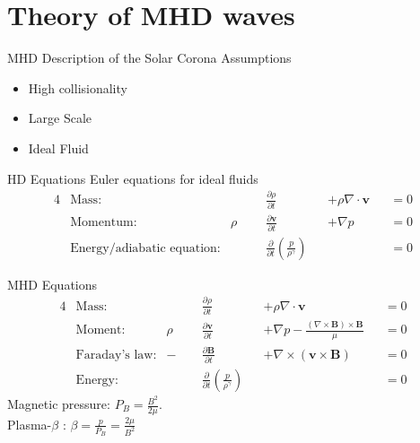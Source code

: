 \documentclass{beamer}
\begin{document}
\section{Theory of MHD waves}
\begin{frame}{MHD Description of the Solar Corona}
    \centering
    Assumptions
    \begin{itemize}
        \item High collisionality
        \item Large Scale
        \item Ideal Fluid
    \end{itemize}
\end{frame}
\begin{frame}{HD Equations}
Euler equations for ideal fluids
\begin{alignat*}{4}
	&\text{Mass:} &\quad\quad &\frac{\partial \rho}{\partial t} & &+ \rho \nabla \cdot \mathbf v & &=  0 \\
	&\text{Momentum:} & \rho& \frac{\partial \mathbf v}{\partial t} & &+ \nabla p & &= 0\\
	&\text{Energy/adiabatic equation:} & &\frac{\partial }{\partial t} \left( \frac{p}{\rho^{\gamma}} \right)  & & & &= 0
\end{alignat*}
\end{frame}
\begin{frame}{MHD Equations}
    \begin{alignat*}{4}
	&\text{Mass:} &\quad\quad &\frac{\partial \rho}{\partial t} & & +\rho \nabla \cdot \mathbf v& &= 0 \\ 	
	&\text{Moment:} & \rho& \frac{\partial \mathbf v}{\partial t} & &+ \nabla p - \frac{(\nabla \times \mathbf B) \times \mathbf B}{\mu}& &=  0  \\
	&\text{Faraday's law:} & -&\frac{\partial \mathbf B}{\partial t} & &+ \nabla \times (\mathbf v \times \mathbf B)& &= 0 \\
	&\text{Energy:} & &\frac{\partial }{\partial t} \left( \frac{p}{\rho^{\gamma}} \right)  & & & &= 0 
\end{alignat*}
Magnetic pressure: $P_B = \frac{B^2}{2\mu}$. \\Plasma-$\beta$ : $\beta = \frac{p}{P_B} = \frac{2\mu}{B^2}$
\end{frame}
\end{document}
